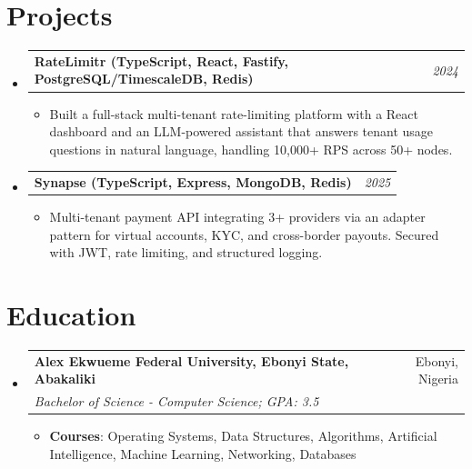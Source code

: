 \documentclass[a4paper]{article}
\makeatletter
\newcommand{\resumeItem}[2]{ \item\small{ \textbf{#1}: #2 } }
\newcommand{\resumeSubheading}[4]{
\vspace{-1pt}
\item[]
\begin{tabular*}{0.97\textwidth}{l@{\extracolsep{\fill}}r}
	\textbf{#1} & #2          \\
	\textit{#3} & \textit{#4} \\
\end{tabular*}
\vspace{1pt}
}
\newcommand{\resumeProjectHeading}[2]{ %
\vspace{2pt}
\item[]
\begin{tabular*}{0.97\textwidth}{l@{\extracolsep{\fill}}r}
	\textbf{#1} & \textit{#2} \\
\end{tabular*}
\vspace{0pt}
}
\newcommand{\resumeSubHeadingListStart}{\begin{itemize}[leftmargin=*,topsep=1pt]}
\newcommand{\resumeSubHeadingListEnd}{\end{itemize}}
\newcommand{\resumeItemListStart}{\begin{itemize}[topsep=0pt,itemsep=0pt,parsep=0pt]}
\newcommand{\resumeItemListEnd}{\end{itemize}}
\makeatother
\begin{document}
	\section{Projects}
	\resumeSubHeadingListStart
	\resumeProjectHeading{RateLimitr (TypeScript, React, Fastify, PostgreSQL/TimescaleDB, Redis)}{2024}
	\resumeItemListStart
	\item\small{Built a full-stack multi-tenant rate-limiting platform with a React dashboard and an LLM-powered assistant that answers tenant usage questions in natural language, handling 10,000+ RPS across 50+ nodes.}
	\resumeItemListEnd
	\resumeProjectHeading{Synapse (TypeScript, Express, MongoDB, Redis)}{2025}
	\resumeItemListStart
	\item\small{Multi-tenant payment API integrating 3+ providers via an adapter pattern for virtual accounts, KYC, and cross-border payouts. Secured with JWT, rate limiting, and structured logging.}
	\resumeItemListEnd
	\resumeSubHeadingListEnd

	\section{Education}
	\resumeSubHeadingListStart
	\resumeSubheading
	{Alex Ekwueme Federal University, Ebonyi State, Abakaliki}{Ebonyi, Nigeria}
	{Bachelor of Science - Computer Science; GPA: 3.5}{}
	\resumeItemListStart
	\resumeItem{Courses}{Operating Systems, Data Structures, Algorithms, Artificial Intelligence, Machine Learning, Networking, Databases}
	\resumeItemListEnd
	\resumeSubHeadingListEnd
\end{document}
